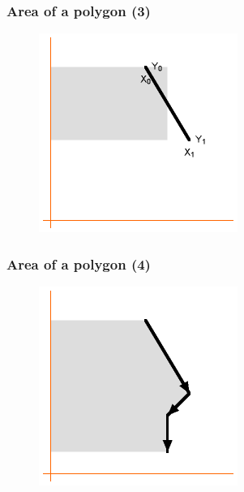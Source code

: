 \documentclass[pdf]{beamer}
\begin{document}
\begin{frame}
	\frametitle{Area of a polygon (3)}
	\begin{figure}
		\centering
		\includegraphics[width=0.7\linewidth]{area2}
	\end{figure}
\end{frame}

\begin{frame}
	\frametitle{Area of a polygon (4)}
	\begin{figure}
		\centering
		\includegraphics[width=0.7\linewidth]{area3}
	\end{figure}
\end{frame}
\end{document}
